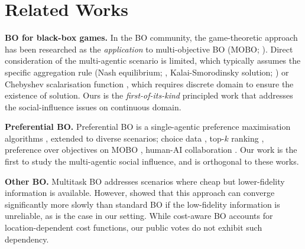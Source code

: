 \section{Related Works}
\vspace{-0.5em}

\textbf{BO for black-box games.} 
In the BO community, the game-theoretic approach has been researched as the \emph{application} to multi-objective BO (MOBO; \citet{hernandez2016predictive, daulton2020differentiable}). Direct consideration of the multi-agentic scenario is limited, which typically assumes the specific aggregation rule (Nash equilibrium; \citet{al2018approximating, picheny2019bayesian, han2024noregret}, Kalai-Smorodinsky solution; \citet{binois2020kalai}) or Chebyshev scalarisation function \citep{astudillo2024preferential}, which requires discrete domain to ensure the existence of solution. Ours is the \emph{first-of-its-kind} principled work that addresses the social-influence issues on continuous domain.

\textbf{Preferential BO.} 
Preferential BO is a single-agentic preference maximisation algorithms \citep{gonzalez2017preferential, astudillo2023qeubo, xu2024principled}, extended to diverse scenarios; choice data \citep{benavoli2023bayesian}, top-$k$ ranking \citep{nguyen2021top}, preference over objectives on MOBO \citep{abdolshah2019multi, ozaki2024multi}, human-AI collaboration \citep{adachi2024looping, xu2025principled}. Our work is the first to study the multi-agentic social influence, and is orthogonal to these works.

\textbf{Other BO.} 
Multitask BO \citep{kandasamy2016gaussian} addresses scenarios where cheap but lower-fidelity information is available. However, \citet{mikkola2023multi} showed that this approach can converge significantly more slowly than standard BO if the low-fidelity information is unreliable, as is the case in our setting. While cost-aware BO \citep{lee2020cost} accounts for location-dependent cost functions, our public votes do not exhibit such dependency.
\vspace{-0.5em}